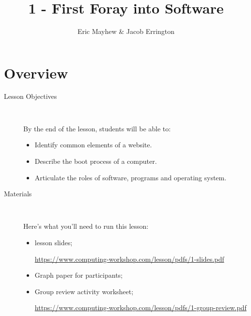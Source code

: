 \documentclass[11pt]{article}
\title{1 - First Foray into Software}
\author{Eric Mayhew \& Jacob Errington}
\date{}
\newcommand{\cwurl}{https://www.computing-workshop.com/lesson/pdfs/}
\begin{document}
\renewcommand{\abstractname}{\vspace{-\baselineskip}}
\maketitle
\begin{abstract}

\end{abstract}
\section*{Overview}
\begin{description}
  \item [Lesson Objectives] 
    ~

   By the end of the lesson, students will be able to:
  \begin{itemize}

    \item Identify common elements of a website.

    \item Describe the boot process of a computer.

    \item Articulate the roles of software, programs and operating
      system.

  \end{itemize}
  \item [Materials]~

Here's what you'll need to run this lesson:
  \begin{itemize}
    \item
      lesson slides;

      \url{\cwurl 1-slides.pdf}

    \item
      Graph paper for participants;

    \item
      Group review activity worksheet;

      \url{\cwurl 1-group-review.pdf}
  \end{itemize}
\end{description}
\end{document}
